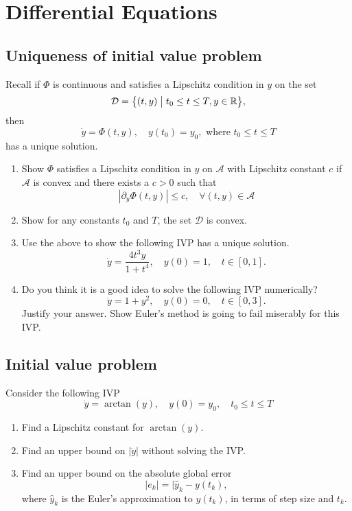 \chapter{Differential Equations}

\section{Uniqueness of initial value problem}
Recall if \(\Phi\) is continuous and satisfies a Lipschitz condition in \(y\) on the set
\[ \mathcal{D} = \Set{(t, y)}{t_0 \leq t \leq T, y\in\R}, \]
then
\[ \dot{y} = \Phi(t, y), \quad  y(t_0) = y_0, \text{ where } t_0 \leq t \leq T \]
has a unique solution.
\begin{enumerate}
	\item Show \(\Phi\) satisfies a Lipschitz condition in \(y\) on \(\mathcal{A}\) with Lipschitz constant \(c\) if \(\mathcal{A}\) is convex and there exists a \(c > 0\) such that
	\[ \left|\partial_{y}\Phi(t,y)\right|\leq c, \quad \forall (t,y)\in\mathcal{A} \]
	\item Show for any constants \(t_0\) and \(T\), the set \(\mathcal{D}\) is convex.
	\item Use the above to show the following IVP has a unique solution.
	\[ \dot{y}=\frac{4t^3y}{1+t^4}, \quad y(0)=1, \quad t\in[0,1]. \]
	\item Do you think it is a good idea to solve the following IVP numerically?
	\[ \dot{y}=1+y^2, \quad y(0)=0, \quad t\in[0,3]. \]
	Justify your answer.
	Show Euler's method is going to fail miserably for this IVP.
\end{enumerate}


\section{Initial value problem}
Consider the following IVP
\[ \dot{y} = \arctan(y), \quad y(0) = y_0, \quad t_0\leq t\leq T \]
\begin{enumerate}
	\item Find a Lipschitz constant for \(\arctan(y)\).
	\item Find an upper bound on \(|\ddot{y}|\) without solving the IVP.
	\item Find an upper bound on the absolute global error
	\[ |e_k|=|\hat{y}_k-y(t_k), \]
	where \(\hat{y}_k\) is the Euler's approximation to \(y(t_k)\), in terms of step size and \(t_k\).
\end{enumerate}


